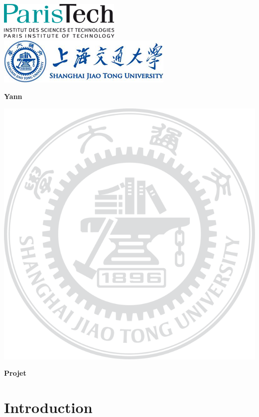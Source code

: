 \documentclass[a4paper,12pt]{book}
\begin{document}
\renewcommand{\labelitemi}{$\blacktriangleright$}
\renewcommand{\labelitemii}{$\bullet$}

\thispagestyle{empty}
\begin{center}
\includegraphics{Image/cover1}
\hspace{86pt}
\includegraphics{Image/cover2}
\end{center}
%
\vspace{125pt}
%
\begin{center}
\scalebox{1.0}{\Huge{\textbf{}}}
\end{center}

\begin{center}
\end{center}
%
\vspace{2em} \Large
%
\begin{center}
\textbf{Yann}
\end{center}
%
\vspace{1em}
%
\begin{center}
\includegraphics[scale=1.2]{Image/cover3}
\end{center}
%
\vspace{1em} \normalsize
%
\begin{center}
\textbf{Projet} %
\end{center}

\clearpage
\thispagestyle{empty}
\tableofcontents
\clearpage

\section{Introduction}

\newpage



\end{document}
